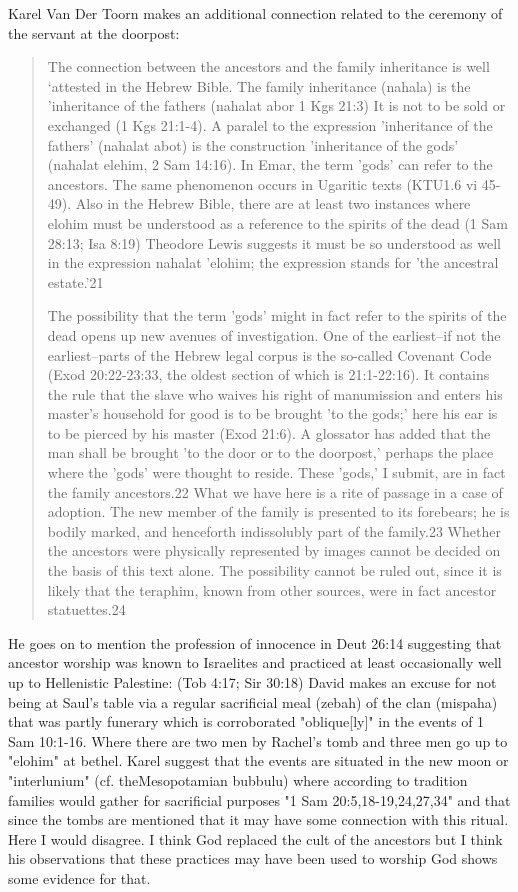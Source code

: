 \documentclass[11pt]{article}
\begin{document}
{Karel Van Der Toorn makes an additional connection related to the ceremony of the servant at the doorpost:
\begin{quote}
The connection between the ancestors and the family inheritance is well `attested in the Hebrew Bible. The family inheritance (nahala) is the 'inheritance of the fathers (nahalat abor 1 Kgs 21:3) It is not to be sold or exchanged (1 Kgs 21:1-4). A paralel to the expression 'inheritance of the fathers' (nahalat abot) is the construction 'inheritance of the gods' (nahalat elehim, 2 Sam 14:16). In Emar, the term 'gods' can refer to the ancestors. The same phenomenon occurs in Ugaritic texts (KTU1.6 vi 45-49). Also in the Hebrew Bible, there are at least two instances where elohim must be understood as a reference to the spirits of the dead (1 Sam 28:13; Isa 8:19) Theodore Lewis suggests it must be so understood as well in the expression nahalat 'elohim; the expression stands for 'the ancestral estate.'21

The possibility that the term 'gods' might in fact refer to the spirits of the dead opens up new avenues of investigation. One of the earliest--if not the earliest--parts of the Hebrew legal corpus is the so-called Covenant Code (Exod 20:22-23:33, the oldest section of which is 21:1-22:16). It contains the rule that the slave who waives his right of manumission and enters his master's household for good is to be brought 'to the gods;' here his ear is to be pierced by his master (Exod 21:6). A glossator has added that the man shall be brought 'to the door or to the doorpost,' perhaps the place where the 'gods' were thought to reside. These 'gods,' I submit, are in fact the family ancestors.22 What we have here is a rite of passage in a case of adoption. The new member of the family is presented to its forebears; he is bodily marked, and henceforth indissolubly part of the family.23 Whether the ancestors were physically represented by images cannot be decided on the basis of this text alone. The possibility cannot be ruled out, since it is likely that the teraphim, known from other sources, were in fact ancestor statuettes.24
\end{quote}

He goes on to mention the profession of innocence in Deut 26:14 suggesting that ancestor worship was known to Israelites and practiced at least occasionally well up to Hellenistic Palestine: (Tob 4:17; Sir 30:18) David makes an excuse for not being at Saul's table via a regular sacrificial meal (zebah) of the clan (mispaha) that was partly funerary which is corroborated "oblique[ly]" in the events of 1 Sam 10:1-16. Where there are two men by Rachel's tomb and three men go up to "elohim" at bethel. Karel suggest that the events are situated in the new moon or "interlunium" (cf. theMesopotamian bubbulu) where according to tradition families would gather for sacrificial purposes "1 Sam 20:5,18-19,24,27,34" and that since the tombs are mentioned that it may have some connection with this ritual. Here I would disagree. I think God replaced the cult of the ancestors but I think his observations that these practices may have been used to worship God shows some evidence for that.

}
\end{document}
